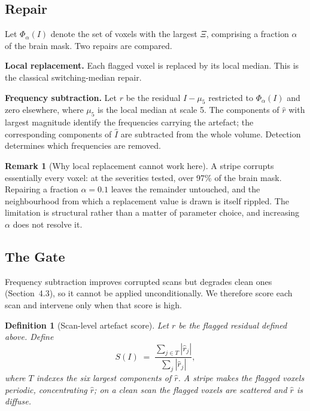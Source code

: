 \documentclass[12pt]{article}
\newtheorem{definition}{Definition}[section]
\theoremstyle{definition}
\newtheorem{remark}{Remark}[section]
\theoremstyle{plain}
\begin{document}
\subsection{Repair}

Let $\Phi_\alpha(I)$ denote the set of voxels with the largest $\Xi$, comprising a
fraction $\alpha$ of the brain mask. Two repairs are compared.

\textbf{Local replacement.} Each flagged voxel is replaced by its local median. This
is the classical switching-median repair.

\textbf{Frequency subtraction.} Let $r$ be the residual $I - \mu_5$ restricted to
$\Phi_\alpha(I)$ and zero elsewhere, where $\mu_5$ is the local median at scale 5.
The components of $\hat{r}$ with largest magnitude identify the frequencies carrying
the artefact; the corresponding components of $\hat{I}$ are subtracted from the whole
volume. Detection determines which frequencies are removed.

\begin{remark}[Why local replacement cannot work here]\label{rem:localfail}
A stripe corrupts essentially every voxel: at the severities tested, over 97\% of the
brain mask. Repairing a fraction $\alpha = 0.1$ leaves the remainder untouched, and
the neighbourhood from which a replacement value is drawn is itself rippled. The
limitation is structural rather than a matter of parameter choice, and increasing
$\alpha$ does not resolve it.
\end{remark}

\subsection{The Gate}

Frequency subtraction improves corrupted scans but degrades clean ones
(Section~4.3), so it cannot be applied unconditionally. We therefore score each scan
and intervene only when that score is high.

\begin{definition}[Scan-level artefact score]
Let $r$ be the flagged residual defined above. Define
\begin{equation}
    S(I) \;=\; \frac{\sum_{j \in T} |\hat{r}_j|}{\sum_j |\hat{r}_j|},
\end{equation}
where $T$ indexes the six largest components of $\hat{r}$. A stripe makes the flagged
voxels periodic, concentrating $\hat{r}$; on a clean scan the flagged voxels are
scattered and $\hat{r}$ is diffuse.
\end{definition}
\end{document}
